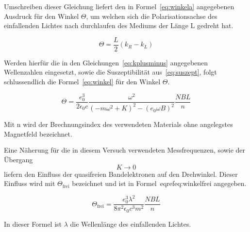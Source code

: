 Umschreiben dieser 
Gleichung liefert den in Formel~\eqref{eq:winkela} angegebenen 
Ausdruck für den Winkel $\Theta$, um welchen sich die 
Polarisationsachse des einfallenden Lichtes nach durchlaufen 
des Mediums der Länge L gedreht hat.

\begin{equation}
\Theta = \frac{L}{2}(k_R - k_L)
\label{eq:winkela}
\end{equation}

Werden hierfür die in den Gleichungen~\eqref{eq:kplusminus} 
angegebenen Wellenzahlen eingesetzt, sowie die Suszeptibilität 
aus~\eqref{eq:suszept}, folgt schlussendlich die 
Formel~\eqref{eq:winkel} für den Winkel $\Theta$. 

\begin{equation}
\Theta = \frac{e_0^3}{2\epsilon_0c}\frac{\omega^2}{(-m\omega^2 
+ K)^2 - (e_0\omega B)^2}
\frac{NBL}{n}
\label{eq:winkel}
\end{equation}

Mit n wird der Brechnungsindex des verwendeten Materials ohne 
angelegstes Magnetfeld bezeichnet.

Eine Näherung für die in diesem Versuch verwendeten Messfrequenzen, 
sowie der Übergang
\begin{equation*}
K \rightarrow 0 
\end{equation*}
liefern den Einfluss der quasifreien Bandelektronen auf den 
Drehwinkel. Dieser Einfluss wird mit $\Theta_\text{frei}$ 
bezeichnet und ist in Formel~eqref{eq:winkelfrei} angegeben.

\begin{equation}
\Theta_\text{frei} = \frac{e_0^3\lambda^2}{8\pi^2\epsilon_0c^3m^2}
\frac{NBL}{n}
\label{eq:winkelfrei}
\end{equation}

In dieser Formel ist $\lambda$ die Wellenlänge des einfallenden 
Lichtes.